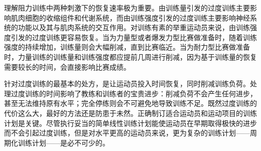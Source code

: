 理解阻力训练中两种刺激下的恢复速率极为重要。由训练量引发的过度训练主要影响肌肉细胞的收缩组件和代谢系统，而由训练强度引发的过度训练主要影响神经系统的功能以及其与肌肉系统的交互作用。对训练有素的举重运动员来说，由训练强度引发的过度训练更容易恢复。当为力量型或者爆发力型比赛做准备时，随着训练强度的持续增加，训练量则会大幅削减，直到比赛临近。当为耐力型比赛做准备时，力量训练的训练量和训练强度都应提前几周进行削减，因为基于训练量的恢复需要较长的时间，会直接影响比赛成绩。

针对过度训练的最基本的处方，是让运动员投入时间恢复，同时削减训练负荷。处理过度训练的时间影响了教练和训练者的宝贵进步：削减负荷不会产生任何进步，甚至无法维持原有水平；完全停练则会不可避免地导致训练不足。既然过度训练的代价这么大，最好的方法还是防患于未然。正确制订适合运动员和运动项目的训练计划是关键。尽管执行妥当的简单线性训练计划能使运动员在早期取得极快的进步而不会引起过度训练，但是对水平更高的运动员来说，更为复杂的训练计划——周期化训练计划——是必不可少的。